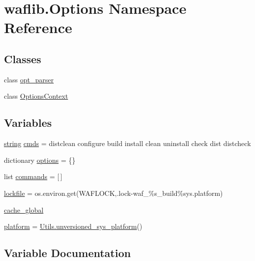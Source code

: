 \hypertarget{namespacewaflib_1_1_options}{}\section{waflib.\+Options Namespace Reference}
\label{namespacewaflib_1_1_options}
\subsection*{Classes}
\begin{DoxyCompactItemize}
\item 
class \hyperlink{classwaflib_1_1_options_1_1opt__parser}{opt\+\_\+parser}
\item 
class \hyperlink{classwaflib_1_1_options_1_1_options_context}{Options\+Context}
\end{DoxyCompactItemize}
\subsection*{Variables}
\begin{DoxyCompactItemize}
\item 
\hyperlink{test__lib_f_l_a_c_2format_8c_ab02026ad0de9fb6c1b4233deb0a00c75}{string} \hyperlink{namespacewaflib_1_1_options_a5479000d2a6733789d312131d5986675}{cmds} = \textquotesingle{}distclean configure build install clean uninstall check dist distcheck\textquotesingle{}
\item 
dictionary \hyperlink{namespacewaflib_1_1_options_a59b9c00933a268d11c1c960cd109e113}{options} = \{\}
\item 
list \hyperlink{namespacewaflib_1_1_options_a22160f1b2c16a64ebaa7e03b7ce3a490}{commands} = \mbox{[}$\,$\mbox{]}
\item 
\hyperlink{namespacewaflib_1_1_options_a1a4644d17d5132ca20bece814d2725b5}{lockfile} = os.\+environ.\+get(\textquotesingle{}W\+A\+F\+L\+O\+CK\textquotesingle{},\textquotesingle{}.lock-\/waf\+\_\+\%s\+\_\+build\textquotesingle{}\%sys.\+platform)
\item 
\hyperlink{namespacewaflib_1_1_options_ac881e7a851ac9fa37652fe9e6dc96064}{cache\+\_\+global}
\item 
\hyperlink{namespacewaflib_1_1_options_a5471b4f49bba1a36759b141851f7f4ce}{platform} = \hyperlink{namespacewaflib_1_1_utils_a28133bb5f262617cb53203566b622507}{Utils.\+unversioned\+\_\+sys\+\_\+platform}()
\end{DoxyCompactItemize}


\subsection{Variable Documentation}
